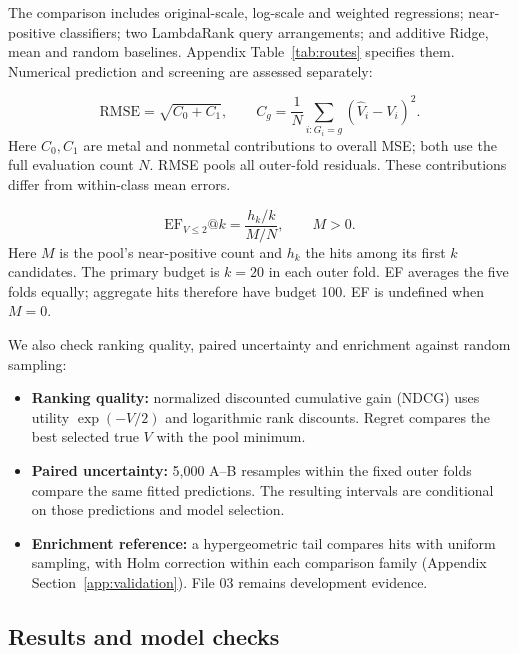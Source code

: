 The comparison includes original-scale, log-scale and weighted regressions; near-positive classifiers; two LambdaRank query arrangements; and additive Ridge, mean and random baselines. Appendix Table~\ref{tab:routes} specifies them. Numerical prediction and screening are assessed separately:
\begin{samepage}
\begin{equation}
 \mathrm{RMSE}=\sqrt{C_0+C_1},\qquad
 C_g=\frac{1}{N}\sum_{i:G_i=g}(\widehat V_i-V_i)^2.
 \label{eq:error}
\end{equation}
\noindent Here $C_0,C_1$ are metal and nonmetal contributions to overall MSE; both use the full evaluation count $N$. RMSE pools all outer-fold residuals. These contributions differ from within-class mean errors.
\end{samepage}
\begin{samepage}
\begin{equation}
 \mathrm{EF}_{V\le2}@k=\frac{h_k/k}{M/N},\qquad M>0.
 \label{eq:ef}
\end{equation}
\noindent Here $M$ is the pool's near-positive count and $h_k$ the hits among its first $k$ candidates. The primary budget is $k=20$ in each outer fold. EF averages the five folds equally; aggregate hits therefore have budget 100. EF is undefined when $M=0$.
\end{samepage}

We also check ranking quality, paired uncertainty and enrichment against random sampling:
\begin{itemize}
  \item \textbf{Ranking quality:} normalized discounted cumulative gain (NDCG) uses utility $\exp(-V/2)$ and logarithmic rank discounts. Regret compares the best selected true $V$ with the pool minimum.
  \item \textbf{Paired uncertainty:} 5,000 A--B resamples within the fixed outer folds compare the same fitted predictions. The resulting intervals are conditional on those predictions and model selection.
  \item \textbf{Enrichment reference:} a hypergeometric tail compares hits with uniform sampling, with Holm correction within each comparison family (Appendix Section~\ref{app:validation}). File 03 remains development evidence.
\end{itemize}
\FloatBarrier

\subsection{Results and model checks}
